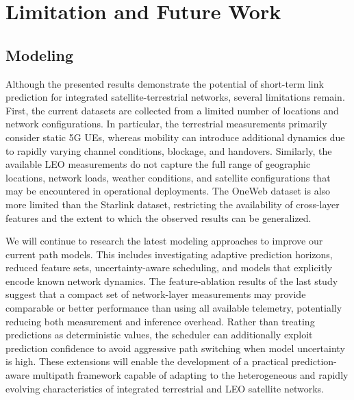 \documentclass[sigconf,nonacm]{acmart}
\begin{document}


\section{Limitation and Future Work}
\label{sec:limitations}

\subsection{Modeling}
Although the presented results demonstrate the potential of short-term link prediction for integrated satellite-terrestrial networks, several limitations remain. First, the current datasets are collected from a limited number of locations and network configurations. In particular, the terrestrial measurements primarily consider static 5G UEs, whereas mobility can introduce additional dynamics due to rapidly varying channel conditions, blockage, and handovers. Similarly, the available LEO measurements do not capture the full range of geographic locations, network loads, weather conditions, and satellite configurations that may be encountered in operational deployments. The OneWeb dataset is also more limited than the Starlink dataset, restricting the availability of cross-layer features and the extent to which the observed results can be generalized.

We will continue to research the latest modeling approaches to improve our current path models. This includes investigating adaptive prediction horizons, reduced feature sets, uncertainty-aware scheduling, and models that explicitly encode known network dynamics. The feature-ablation results of the last study suggest that a compact set of network-layer measurements may provide comparable or better performance than using all available telemetry, potentially reducing both measurement and inference overhead. Rather than treating predictions as deterministic values, the scheduler can additionally exploit prediction confidence to avoid aggressive path switching when model uncertainty is high. These extensions will enable the development of a practical prediction-aware multipath framework capable of adapting to the heterogeneous and rapidly evolving characteristics of integrated terrestrial and LEO satellite networks.
\end{document}

